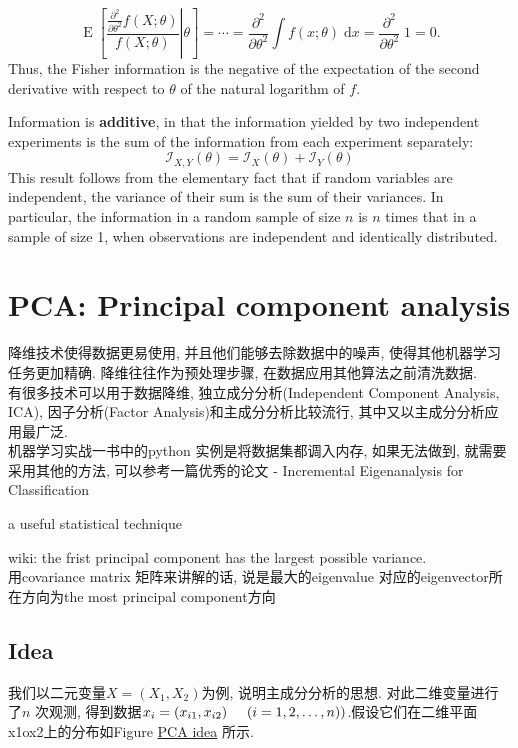 \documentclass{article}
\begin{document}
$$
\operatorname{E} \left[\left. \frac{\frac{\partial^2}{\partial\theta^2} f(X;\theta)}{f(X; \theta)}\right|\theta \right]
= \cdots
= \frac{\partial^2}{\partial\theta^2} \int f(x; \theta)\; \mathrm{d}x
= \frac{\partial^2}{\partial\theta^2} \; 1
= 0.
$$
Thus, the Fisher information is the negative of the expectation of the second derivative with respect to $\theta$ of the natural logarithm of $f$.

Information is \textbf{additive}, in that the information yielded by two independent experiments is the sum of the information from each experiment separately:
$$ \mathcal{I}_{X,Y}(\theta) = \mathcal{I}_X(\theta) + \mathcal{I}_Y(\theta) $$
This result follows from the elementary fact that if random variables are independent, the variance of their sum is the sum of their variances.
In particular, the information in a random sample of size $n$ is $n$ times that in a sample of size 1,
when observations are independent and identically distributed.

\section{PCA: Principal component analysis}
降维技术使得数据更易使用, 并且他们能够去除数据中的噪声, 使得其他机器学习任务更加精确. 降维往往作为预处理步骤, 在数据应用其他算法之前清洗数据.\\
有很多技术可以用于数据降维, 独立成分分析(Independent Component Analysis, ICA), 因子分析(Factor Analysis)和主成分分析比较流行, 其中又以主成分分析应用最广泛.\\
机器学习实战一书中的python 实例是将数据集都调入内存, 如果无法做到, 就需要采用其他的方法, 可以参考一篇优秀的论文 - Incremental Eigenanalysis for Classification

a useful statistical technique

wiki: the frist principal component has the largest possible variance.\\
\noindent
用covariance matrix 矩阵来讲解的话, 说是最大的eigenvalue 对应的eigenvector所在方向为the most principal component方向\\

\subsection{Idea}
我们以二元变量$X = (X_1, X_2)$为例, 说明主成分分析的思想. 对此二维变量进行了$n$ 次观测, 得到数据$x_i = (x_{i1},x_{i2}) \hspace{0.5cm} (i=1,2,\dots,n))$.假设它们在二维平面x1ox2上的分布如Figure
\href{http://upload.wikimedia.org/wikipedia/commons/thumb/1/15/GaussianScatterPCA.png/220px-GaussianScatterPCA.png}{PCA idea}
所示.
\end{document}
